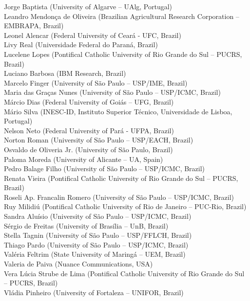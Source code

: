 \documentclass[english, titlepage, a4paper]{lni}
\begin{document}
Jorge Baptista (University of Algarve – UAlg, Portugal)\\
Leandro Mendonça de Oliveira (Brazilian Agricultural Research Corporation – EMBRAPA, Brazil)\\
Leonel Alencar (Federal University of Cear\'{a} - UFC, Brazil)\\
Livy Real (Universidade Federal do Paran\'{a}, Brazil)\\
Lucelene Lopes (Pontifical Catholic University of Rio Grande do Sul – PUCRS, Brazil)\\
Luciano Barbosa (IBM Research, Brazil)\\
Marcelo Finger (University of S\~{a}o Paulo – USP/IME, Brazil)\\
Maria das Graças Nunes (University of S\~{a}o Paulo – USP/ICMC, Brazil)\\
M\'{a}rcio Dias (Federal University of Goi\'{a}s – UFG, Brazil)\\
M\'{a}rio Silva (INESC-ID, Instituto Superior T\'{e}cnico, Universidade de Lisboa, Portugal)\\
Nelson Neto (Federal University of Par\'{a} - UFPA, Brazil)\\
Norton Roman (University of S\~{a}o Paulo – USP/EACH, Brazil)\\
Osvaldo de Oliveria Jr. (University of S\~{a}o Paulo, Brazil)\\
Paloma Moreda (University of Alicante – UA, Spain)\\
Pedro Balage Filho (University of S\~{a}o Paulo – USP/ICMC, Brazil)\\
Renata Vieira (Pontifical Catholic University of Rio Grande do Sul – PUCRS, Brazil)\\
Roseli Ap. Francalin Romero (University of S\~{a}o Paulo – USP/ICMC, Brazil)\\
Ruy Milidi\'{u} (Pontifical Catholic University of Rio de Janeiro – PUC-Rio, Brazil)\\
Sandra Alu\'{i}sio (University of S\~{a}o Paulo – USP/ICMC, Brazil)\\
S\'{e}rgio de Freitas (University of Bras\'{i}lia – UnB, Brazil)\\
Stella Tagnin (University of S\~{a}o Paulo – USP/FFLCH, Brazil)\\
Thiago Pardo (University of S\~{a}o Paulo – USP/ICMC, Brazil)\\
Val\'{e}ria Feltrim (State University of Maring\'{a} – UEM, Brazil)\\
Valeria de Paiva (Nuance Communications, USA)\\
Vera L\'{u}cia Strube de Lima (Pontifical Catholic University of Rio Grande do Sul – PUCRS, Brazil)\\
Vl\'{a}dia Pinheiro (University of Fortaleza – UNIFOR, Brazil)
\end{document}
